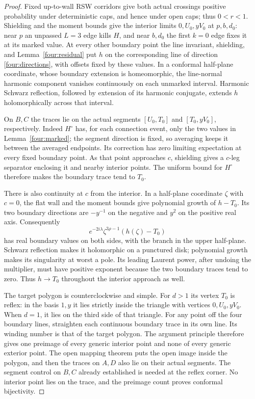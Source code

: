 \begin{proof}
Fixed up-to-wall RSW corridors give both actual crossings positive
probability under deterministic caps, and hence under open caps;
thus $0<r<1$.  Shielding and the moment bounds give the interior
limits $0,U_0,yV_0$ at $p,b,d_0$: near $p$ an unpassed $L=3$ edge
kills $H$, and near $b,d_0$ the first $k=0$ edge fixes it at its marked
value.  At every other boundary point the line invariant, shielding,
and Lemma~\ref{four:residual} put $h$ on the corresponding line of
direction \eqref{four:directions}, with offsets fixed by these values.
In a conformal half-plane coordinate, whose boundary extension is
homeomorphic, the line-normal harmonic component vanishes continuously
on each unmarked interval.  Harmonic Schwarz reflection, followed by
extension of its harmonic conjugate, extends $h$ holomorphically across
that interval.

On $B,C$ the traces lie on the actual segments
$[U_0,T_0]$ and $[T_0,yV_0]$, respectively.  Indeed $H^\circ$ has,
for each connection event, only the two values in
Lemma~\ref{four:marked}; the segment direction is fixed, so averaging
keeps it between the averaged endpoints.  Its correction has zero
limiting expectation at every fixed boundary point.  As that point
approaches $c$, shielding gives a $c$-leg separator enclosing it and
nearby interior points.  The uniform bound for $H^\circ$ therefore
makes the boundary trace tend to $T_0$.

There is also continuity at $c$ from the interior.  In a half-plane
coordinate $\zeta$ with $c=0$, the flat wall and the moment bounds
give polynomial growth of $h-T_0$.  Its two boundary directions are
$-y^{-1}$ on the negative and $y^2$ on the positive real axis.
Consequently
\begin{equation}
 e^{-2i\lambda}\zeta^{3\rho-1}(h(\zeta)-T_0)
 \label{four:corner-reflection}
\end{equation}
has real boundary values on both sides, with the branch in the upper
half-plane.  Schwarz reflection makes it holomorphic on a punctured
disk; polynomial growth makes its singularity at worst a pole.
Its leading Laurent power, after undoing the multiplier, must have
positive exponent because the two boundary traces tend to zero.
Thus $h\to T_0$ throughout the interior approach as well.

The target polygon is counterclockwise and simple.  For $d>1$ its
vertex $T_0$ is reflex: in the basis $1,y$ it lies strictly inside the
triangle with vertices $0,U_0,yV_0$.  When $d=1$, it lies on the
third side of that triangle.  For any point off the four boundary
lines, straighten each continuous boundary trace in its own line.
Its winding number is that of the target polygon.  The argument
principle therefore gives one preimage of every generic interior
point and none of every generic exterior point.  The open mapping
theorem puts the open image inside the polygon, and then the traces
on $A,D$ also lie on their actual segments.  The segment control on
$B,C$ already established is needed at the reflex corner.  No interior
point lies on the trace, and the preimage count proves conformal
bijectivity.


\end{proof}
